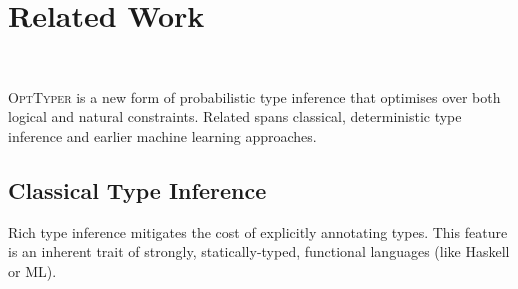 \documentclass[sigplan,10pt,review,anonymous]{acmart} %
\newcommand{\projectname}{\textsc{OptTyper}\xspace}
\newcommand{\margincomment}[2]{\marginpar{\scriptsize\color{Maroon}#1 says: #2}}
\newcommand{\adg}[1]{\margincomment{ADG}{#1}}
\newcommand{\etb}[1]{\margincomment{Earl}{#1}}
\theoremstyle{plain}
\theoremstyle{remark}
\theoremstyle{definition}
\begin{document}



\section{Related Work}~\label{sec:related}

\projectname is a new form of probabilistic type inference that optimises over
both logical and natural constraints.  Related spans classical, deterministic
type inference and earlier machine learning approaches.

\subsection{Classical Type Inference}


Rich type inference mitigates the cost
of explicitly annotating types. This feature is an
inherent trait of strongly, statically-typed, functional languages (like Haskell or ML).

\end{document}
